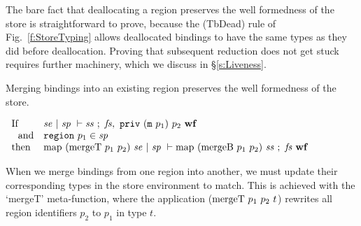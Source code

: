 \medskip\noindent
The bare fact that deallocating a region preserves the well formedness of the store is straightforward to prove, because the (TbDead) rule of Fig.~\ref{f:StoreTyping} allows deallocated bindings to have the same types as they did before deallocation. Proving that subsequent reduction does not get stuck requires further machinery, which we discuss in \S\ref{s:Liveness}.
\qqed

\eject
\begin{lemma} Merging bindings into an existing region preserves the well formedness of the store.
\end{lemma}
$
\begin{array}{ll}
    \textrm{If}        & \mathit{se} ~|~ \mathit{sp} ~\vdash \mathit{ss} ~;~ \mathit{fs},~ \texttt{priv}~ (\texttt{m}~ p_1)~ p_2 ~ {\mathbf{wf}} 
\\  ~~\textrm{and}     & \texttt{region}~ p_1 \in \mathit{sp}
\\  \textrm{then}      & \textrm{map}~ (\textrm{mergeT}~ p_1~ p_2)~ \mathit{se} ~|~ \mathit{sp} ~\vdash \textrm{map}~ (\textrm{mergeB}~ p_1~ p_2)~ \mathit{ss} ~;~ \mathit{fs} ~ {\mathbf{wf}}
\end{array}
$

\medskip\noindent
When we merge bindings from one region into another, we must update their corresponding types in the store environment to match. This is achieved with the `mergeT' meta-function, where the application ($\textrm{mergeT}~p_1~p_2~ t$) rewrites all region identifiers $p_2$ to $p_1$ in type $t$. 
\qqed

